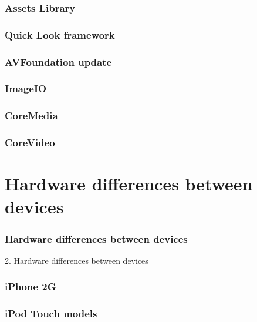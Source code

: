 \documentclass[10pt]{beamer}
\begin{document}
    
\begin{frame}[fragile]
  \frametitle{Assets Library}
  
\end{frame}

    
\begin{frame}[fragile]
  \frametitle{Quick Look framework}
  
\end{frame}

    
\begin{frame}[fragile]
  \frametitle{AVFoundation update}
  
\end{frame}

    
\begin{frame}[fragile]
  \frametitle{ImageIO}
  
\end{frame}

    
\begin{frame}[fragile]
  \frametitle{CoreMedia}
  
\end{frame}

    
\begin{frame}[fragile]
  \frametitle{CoreVideo}
  
\end{frame}

    

   
  

  
    
\section{Hardware differences between devices}
\begin{frame}[fragile]
  \frametitle{Hardware differences between devices}
  2. Hardware differences between devices
\end{frame}


    
\begin{frame}[fragile]
  \frametitle{iPhone 2G}
  
\end{frame}

    
\begin{frame}[fragile]
  \frametitle{iPod Touch models}
  
\end{frame}
\end{document}
